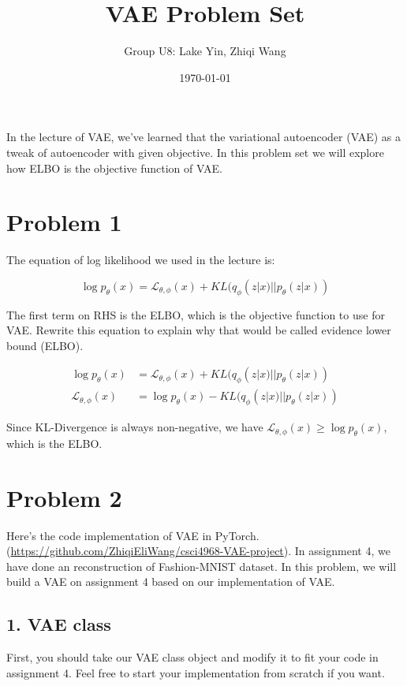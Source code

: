 \documentclass{article}
\begin{document}
\title{\vspace{-3cm}VAE Problem Set}
\author{Group U8: Lake Yin, Zhiqi Wang}
\date{\today}
\maketitle

In the lecture of VAE, we've learned that the variational autoencoder (VAE) as a tweak of autoencoder with given objective. In this problem set we will explore how ELBO is the objective function of VAE.



\section*{Problem 1}

The equation of log likelihood we used in the lecture is:

 $$\log p_\theta (x) = \mathcal{L}_{\theta, \phi}(x) + KL(q_\phi(z|x)||p_\theta(z|x))$$

The first term on RHS is the ELBO, which is the objective function to use for VAE. Rewrite this equation to explain why that would be called evidence lower bound (ELBO).

\color{blue}


\begin{align}
    \log p_\theta(x) &= \mathcal{L}_{\theta, \phi}(x) + KL(q_\phi(z|x)||p_\theta(z|x))\\
    \mathcal{L}_{\theta, \phi}(x) &= \log p_\theta(x) - KL(q_\phi(z|x)||p_\theta(z|x))
\end{align}

Since KL-Divergence is always non-negative, we have $\mathcal{L}_{\theta, \phi}(x) \geq \log p_\theta(x)$, which is the ELBO.

\color{black}

\section*{Problem 2}

Here's the code implementation of VAE in PyTorch. (\href{https://github.com/ZhiqiEliWang/csci4968-VAE-project}{https://github.com/ZhiqiEliWang/csci4968-VAE-project}). In assignment 4, we have done an reconstruction of Fashion-MNIST dataset. In this problem, we will build a VAE on assignment 4 based on our implementation of VAE.


\subsection*{1. VAE class}
First, you should take our VAE class object and modify it to fit your code in assignment 4. Feel free to start your implementation from scratch if you want. 
\end{document}
